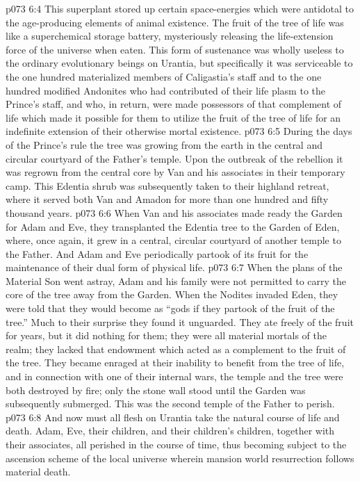 \vs p073 6:4 This superplant stored up certain space\hyp{}energies which were antidotal to the age\hyp{}producing elements of animal existence. The fruit of the tree of life was like a superchemical storage battery, mysteriously releasing the life\hyp{}extension force of the universe when eaten. This form of sustenance was wholly useless to the ordinary evolutionary beings on Urantia, but specifically it was serviceable to the one hundred materialized members of Caligastia’s staff and to the one hundred modified Andonites who had contributed of their life plasm to the Prince’s staff, and who, in return, were made possessors of that complement of life which made it possible for them to utilize the fruit of the tree of life for an indefinite extension of their otherwise mortal existence.\plusone
\pc \vs p073 6:5 During the days of the Prince’s rule the tree was growing from the earth in the central and circular courtyard of the Father’s temple. Upon the outbreak of the rebellion it was regrown from the central core by Van and his associates in their temporary camp. This Edentia shrub was subsequently taken to their highland retreat, where it served both Van and Amadon for more than one hundred and fifty thousand years.
\vs p073 6:6 When Van and his associates made ready the Garden for Adam and Eve, they transplanted the Edentia tree to the Garden of Eden, where, once again, it grew in a central, circular courtyard of another temple to the Father. And Adam and Eve periodically partook of its fruit for the maintenance of their dual form of physical life.
\pc \vs p073 6:7 When the plans of the Material Son went astray, Adam and his family were not permitted to carry the core of the tree away from the Garden. When the Nodites invaded Eden, they were told that they would become as “gods if they partook of the fruit of the tree.” Much to their surprise they found it unguarded. They ate freely of the fruit for years, but it did nothing for them; they were all material mortals of the realm; they lacked that endowment which acted as a complement to the fruit of the tree. They became enraged at their inability to benefit from the tree of life, and in connection with one of their internal wars, the temple and the tree were both destroyed by fire; only the stone wall stood until the Garden was subsequently submerged. This was the second temple of the Father to perish.
\vs p073 6:8 And now must all flesh on Urantia take the natural course of life and death. Adam, Eve, their children, and their children’s children, together with their associates, all perished in the course of time, thus becoming subject to the ascension scheme of the local universe wherein mansion world resurrection follows material death.
